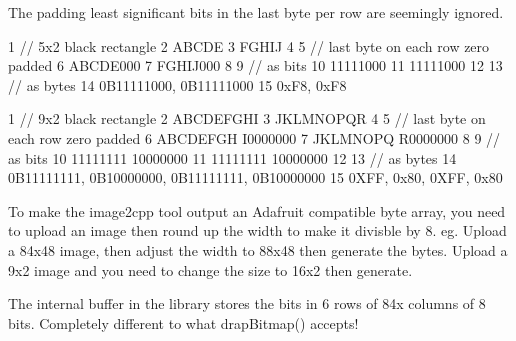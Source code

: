 The padding least significant bits in the last byte per row are seemingly ignored.


\begin{DoxyCode}
1 // 5x2 black rectangle
2 ABCDE
3 FGHIJ
4 
5 // last byte on each row zero padded
6 ABCDE000
7 FGHIJ000
8 
9 // as bits
10 11111000
11 11111000
12 
13 // as bytes
14 0B11111000, 0B11111000
15 0xF8, 0xF8
\end{DoxyCode}



\begin{DoxyCode}
1 // 9x2 black rectangle
2 ABCDEFGHI
3 JKLMNOPQR
4 
5 // last byte on each row zero padded
6 ABCDEFGH I0000000
7 JKLMNOPQ R0000000
8 
9 // as bits
10 11111111 10000000
11 11111111 10000000
12 
13 // as bytes
14 0B11111111, 0B10000000, 0B11111111, 0B10000000
15 0XFF, 0x80, 0XFF, 0x80
\end{DoxyCode}


To make the image2cpp tool output an Adafruit compatible byte array, you need to upload an image then round up the width to make it divisble by 8. eg. Upload a 84x48 image, then adjust the width to 88x48 then generate the bytes. Upload a 9x2 image and you need to change the size to 16x2 then generate.

The internal buffer in the library stores the bits in 6 rows of 84x columns of 8 bits. Completely different to what {\ttfamily drap\+Bitmap()} accepts! 